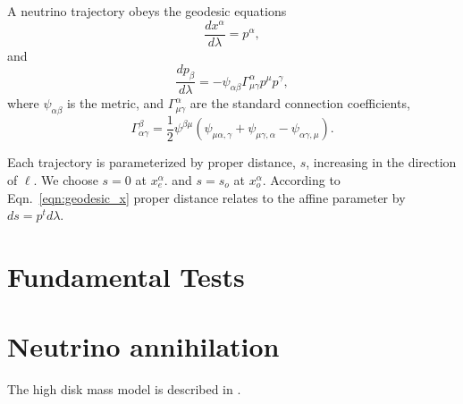 \documentclass[aps,prd,twocolumn,superscriptaddress,groupedaddress]{revtex4}
\begin{document}
A neutrino trajectory obeys the geodesic equations
\begin{equation}
\label{eqn:geodesic_x}
  \frac{d x^\alpha}{d\lambda} = p^\alpha,
\end{equation}
and
\begin{equation}
\label{eqn:geodesic_p}
  \frac{d p_\beta}{d\lambda} = -\psi_{\alpha\beta}\Gamma^\alpha_{\mu\gamma} p^\mu p^\gamma,
\end{equation}
where $\psi_{\alpha\beta}$ is the metric, and
$\Gamma^\alpha_{\mu\gamma}$ are the standard connection coefficients,
\begin{equation}
  \label{eqn:christoffel}
  \Gamma^\beta_{\alpha\gamma} =
  \frac{1}{2} \psi^{\beta\mu}
  (\psi_{\mu\alpha,\gamma} + \psi_{\mu\gamma,\alpha} - \psi_{\alpha\gamma,\mu}).
\end{equation}

Each trajectory is parameterized by proper distance, $s$, increasing in
the direction of $\ell$. We choose $s=0$ at $x^\alpha_e$.
and $s=s_o$ at $x^\alpha_o$.
According to Eqn.~\ref{eqn:geodesic_x} proper distance relates to the affine
parameter by $ds=p^t d\lambda$.

\section{Fundamental Tests}

\section{Neutrino annihilation}
The high disk mass model is described in \cite{deat2013-leakage}.


\end{document}
